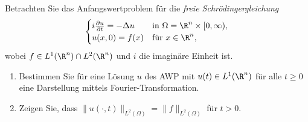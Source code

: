 
\begin{exercise}

Betrachten Sie das Anfangswertproblem für die \textit{freie Schrödingergleichung}
\begin{align*}
  \begin{cases}
  i\frac{\partial u}{\partial t} = -\Delta u & \text{in } \Omega = \R^n \times [0,\infty), \\
  u(x,0) = f(x) & \text{für } x \in \R^n,
  \end{cases}
\end{align*}
wobei $f \in L^1(\R^n) \cap L^2(\R^n)$ und $i$ die imaginäre Einheit ist.
\begin{enumerate}[label = (\roman*)]
  \item Bestimmen Sie für eine Lösung $u$ des AWP mit $u(t) \in L^1(\R^n)$
  für alle $t \geq 0$ eine Darstellung mittels Fourier-Transformation.
  \item Zeigen Sie, dass $\|u(\cdot,t)\|_{L^2(\Omega)} = \|f\|_{L^2(\Omega)}$ für $t > 0$.
\end{enumerate}

\end{exercise}


\begin{solution}

\phantom{}

\end{solution}

